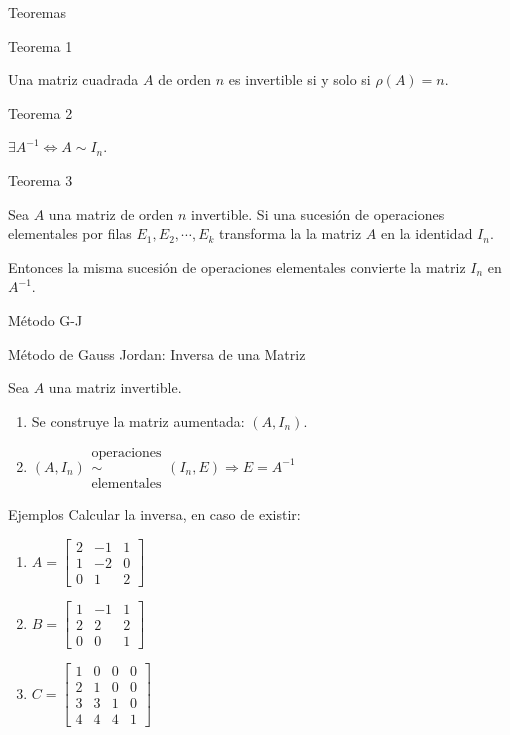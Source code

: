 {Teoremas}
\begin{block}{Teorema 1}

Una matriz cuadrada $A$  de orden $n$ es invertible si y solo si $\rho(A)=n$.
\end{block}

\begin{block}{Teorema 2}

$\exists A^{-1} \Leftrightarrow A \sim I_n$.
\end{block}

\begin{block}{Teorema 3}

Sea $A$ una matriz de orden $n$ invertible. Si una sucesión de operaciones elementales por filas $E_1, E_2, \cdots, E_k$ transforma la la matriz $A$ en la identidad $ I_n$.

Entonces la misma sucesión de operaciones elementales convierte la matriz  $ I_n$ en $A^{-1}$.
\end{block}


{Método G-J}
\begin{block}{Método de Gauss Jordan: Inversa de una Matriz}

Sea $A$ una matriz invertible.

\begin{enumerate}
\item
Se construye la matriz aumentada: $(A,I_n)$.
\item
$(A,I_n)
\begin{array}{c}
\mbox{operaciones}\\
\sim\\
\mbox{elementales}
\end{array}
 (I_n,E) \Rightarrow E=A^{-1}$
\end{enumerate}
\end{block}


{Ejemplos}
Calcular la inversa, en caso de existir:

\begin{enumerate}
\item
$A= \begin{bmatrix}
2 &  -1 & 1 \\
1 &  -2 & 0\\
0 &  1 &  2
\end{bmatrix}
$

\item
$B= \begin{bmatrix}
1 &  -1 & 1 \\
2 &  2 & 2\\
0 &  0 &  1
\end{bmatrix}
$

\item
$C= \begin{bmatrix}
1 &  0 & 0  & 0 \\
2 &  1 & 0  & 0\\
3 &  3 &1  & 0\\
4 &  4 &4  & 1
\end{bmatrix}
$
\end{enumerate}


